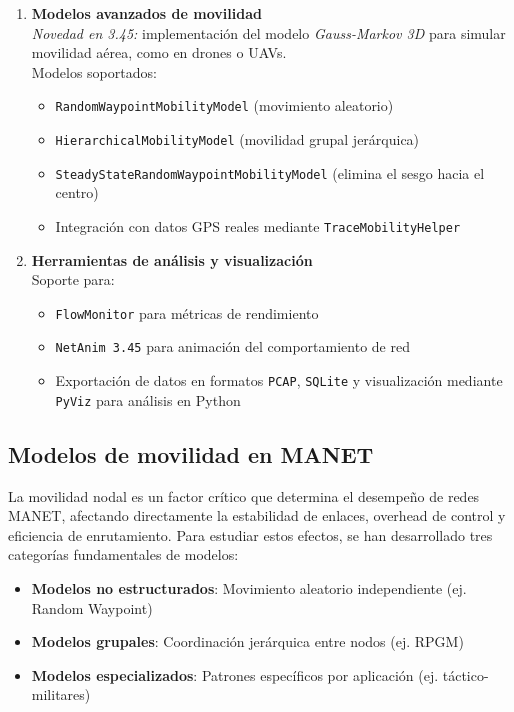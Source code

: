 \documentclass{article}
\begin{document}
\begin{enumerate}
    \item \textbf{Modelos avanzados de movilidad} \\
    \textit{Novedad en 3.45:} implementación del modelo \textit{Gauss-Markov 3D} para simular movilidad aérea, como en drones o UAVs. \\
    Modelos soportados:
    \begin{itemize}
        \item \texttt{RandomWaypointMobilityModel} (movimiento aleatorio)
        \item \texttt{HierarchicalMobilityModel} (movilidad grupal jerárquica)
        \item \texttt{SteadyStateRandomWaypointMobilityModel} (elimina el sesgo hacia el centro)
        \item Integración con datos GPS reales mediante \texttt{TraceMobilityHelper}
    \end{itemize}

    \item \textbf{Herramientas de análisis y visualización} \\
    Soporte para:
    \begin{itemize}
        \item \texttt{FlowMonitor} para métricas de rendimiento
        \item \texttt{NetAnim 3.45} para animación del comportamiento de red
        \item Exportación de datos en formatos \texttt{PCAP}, \texttt{SQLite} y visualización mediante \texttt{PyViz} para análisis en Python
    \end{itemize}
\end{enumerate}


\subsection{Modelos de movilidad en MANET}
La movilidad nodal es un factor crítico que determina el desempeño de redes MANET, afectando directamente la estabilidad de enlaces, overhead de control y eficiencia de enrutamiento. Para estudiar estos efectos, se han desarrollado tres categorías fundamentales de modelos:

\begin{itemize}
    \item \textbf{Modelos no estructurados}: Movimiento aleatorio independiente (ej. Random Waypoint)
    \item \textbf{Modelos grupales}: Coordinación jerárquica entre nodos (ej. RPGM)
    \item \textbf{Modelos especializados}: Patrones específicos por aplicación (ej. táctico-militares)
\end{itemize}
\end{document}
